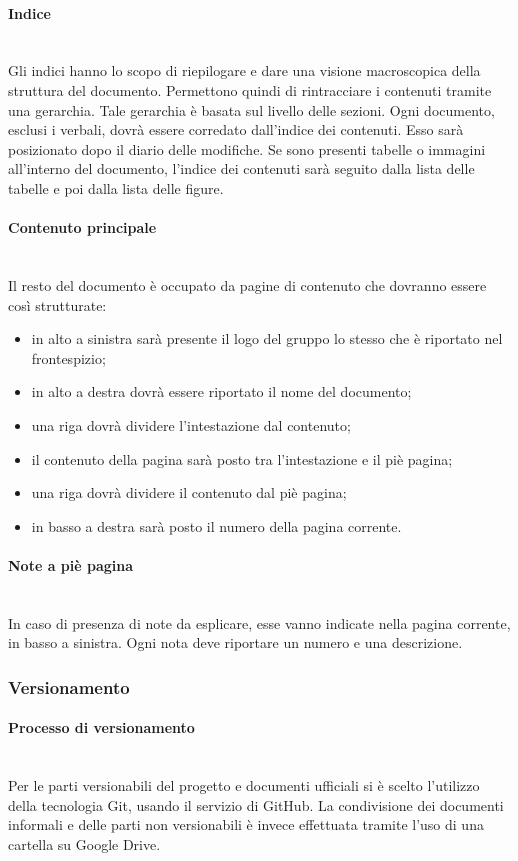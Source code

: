 		\paragraph{Indice} \mbox{}\\
		Gli indici hanno lo scopo di riepilogare e dare una visione macroscopica della
		struttura del documento. Permettono quindi di rintracciare i contenuti tramite una gerarchia. Tale gerarchia è basata sul livello delle sezioni.
		Ogni documento, esclusi i verbali, dovrà essere corredato dall’indice dei contenuti. Esso sarà posizionato dopo il diario delle modifiche. Se sono presenti tabelle o immagini	all’interno del documento, l’indice dei contenuti sarà seguito dalla lista delle tabelle e poi dalla lista delle figure.
		\paragraph{Contenuto principale} \mbox{}\\
		Il resto del documento è occupato da pagine di contenuto che dovranno essere così strutturate:
		\begin{itemize}
			\item in alto a sinistra sarà presente il logo del gruppo lo stesso che è riportato nel frontespizio;
			\item in alto a destra dovrà essere riportato il nome del documento;
			\item una riga dovrà dividere l'intestazione dal contenuto;
			\item il contenuto della pagina sarà posto tra l'intestazione e il piè pagina;
			\item una riga dovrà dividere il contenuto dal piè pagina;
			\item in basso a destra sarà posto il numero della pagina corrente.
		\end{itemize}
		\paragraph{Note a piè pagina} \mbox{}\\
		In caso di presenza di note da esplicare, esse vanno indicate nella pagina corrente, in basso a sinistra. Ogni nota deve riportare un numero e una	descrizione.
		\subsubsection{Versionamento}
		\paragraph{Processo di versionamento} \mbox{}\\
		Per le parti versionabili del progetto e documenti ufficiali si è scelto l’utilizzo della tecnologia Git, usando il servizio di GitHub. La condivisione dei documenti informali e delle parti non versionabili è invece effettuata tramite l’uso di una cartella su Google Drive.
